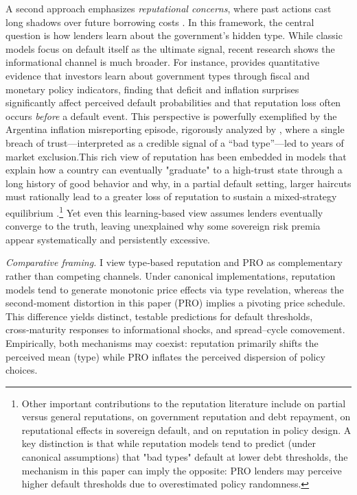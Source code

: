 \documentclass[12pt]{article}
\theoremstyle{plain}
\begin{document}
A second approach emphasizes \textit{reputational concerns}, where past actions
cast long shadows over future borrowing costs \citet{ColeDowEnglish1995,
	Phelan2006}. In this framework, the central question is how lenders learn about
the government's hidden type. While classic models focus on default itself as
the ultimate signal, recent research shows the informational channel is much
broader. For instance, \citet{Fourakis2021} provides quantitative evidence that
investors learn about government types through fiscal and monetary policy
indicators, finding that deficit and inflation surprises significantly affect
perceived default probabilities and that reputation loss often occurs
\textit{before} a default event. This perspective is powerfully exemplified by
the Argentina inflation misreporting episode, rigorously analyzed by
\citet{MorelliMoretti2023}, where a single breach of trust—interpreted as a
credible signal of a ``bad type''—led to years of market exclusion.This rich
view of reputation has been embedded in models that explain how a country can
eventually "graduate" to a high-trust state through a long history of good
behavior \citet{AmadorPhelan2021} and why, in a partial default setting, larger
haircuts must rationally lead to a greater loss of reputation to sustain a
mixed-strategy equilibrium \citet{AmadorPhelan2023}.\footnote{Other important
	contributions to the reputation literature include \citet{ColeKehoe1998} on
	partial versus general reputations, \citet{DErasmo2011} on government
	reputation and debt repayment, \citet{EgorovFabinger2016} on reputational
	effects in sovereign default, and \citet{DovisKirpalani2020,
		DovisKirpalani2021} on reputation in policy design. A key distinction is that
	while reputation models tend to predict (under canonical assumptions) that "bad
	types" default at lower debt thresholds, the mechanism in this paper can imply
	the opposite: PRO lenders may perceive higher default thresholds due to
	overestimated policy randomness.} Yet even this learning-based view assumes
lenders eventually converge to the truth, leaving unexplained why some
sovereign risk premia appear systematically and persistently excessive.

\noindent\textit{Comparative framing.} I view type‑based reputation and PRO as complementary rather than competing channels. Under canonical implementations, reputation models tend to generate monotonic price effects via type revelation, whereas the second‑moment distortion in this paper (PRO) implies a pivoting price schedule. This difference yields distinct, testable predictions for default thresholds, cross‑maturity responses to informational shocks, and spread–cycle comovement. Empirically, both mechanisms may coexist: reputation primarily shifts the perceived mean (type) while PRO inflates the perceived dispersion of policy choices.
\end{document}
